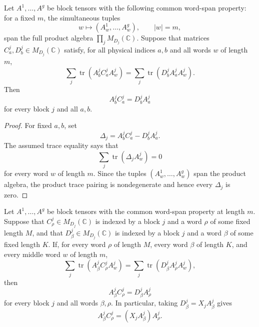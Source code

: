 \begin{lemma}
    \label{lem:blockwise_boundary_compatibility_from_traces}
    \leanok
    Let \(A^1,\ldots,A^g\) be block tensors with the following common
    word-span property: for a fixed \(m\), the simultaneous tuples
    \[
        w\longmapsto
        \left(A^1_w,\ldots,A^g_w\right),
        \qquad |w|=m,
    \]
    span the full product algebra
    \(\prod_j M_{D_j}(\mathbb C)\).
    Suppose that matrices \(C^j_a,D^j_b\in M_{D_j}(\mathbb C)\) satisfy,
    for all physical indices \(a,b\) and all words \(w\) of length \(m\),
    \[
        \sum_j \operatorname{tr}\!\left(A^j_b C^j_a A^j_w\right)
        =
        \sum_j \operatorname{tr}\!\left(D^j_b A^j_a A^j_w\right).
    \]
    Then
    \[
        A^j_bC^j_a=D^j_bA^j_a
    \]
    for every block \(j\) and all \(a,b\).
\end{lemma}

\begin{proof}
    \leanok
    For fixed \(a,b\), set
    \[
        \Delta_j=A^j_bC^j_a-D^j_bA^j_a .
    \]
    The assumed trace equality says that
    \[
        \sum_j \operatorname{tr}\!\left(\Delta_jA^j_w\right)=0
    \]
    for every word \(w\) of length \(m\).  Since the tuples
    \((A^1_w,\ldots,A^g_w)\) span the product algebra, the product trace
    pairing is nondegenerate and hence every \(\Delta_j\) is zero.
\end{proof}

\begin{lemma}
    \label{lem:blockwise_word_boundary_compatibility_from_traces}
    \leanok
    Let \(A^1,\ldots,A^g\) be block tensors with the common word-span property
    at length \(m\). Suppose that \(C^j_\rho \in M_{D_j}(\mathbb C)\) is
    indexed by a block \(j\) and a word \(\rho\) of some fixed length \(M\),
    and that \(D^j_\beta \in M_{D_j}(\mathbb C)\) is indexed by a block
    \(j\) and a word \(\beta\) of some fixed length \(K\). If, for every
    word \(\rho\) of length \(M\), every word \(\beta\) of length \(K\), and
    every middle word \(w\) of length \(m\),
    \[
        \sum_j\operatorname{tr}\!\left(A^j_\beta C^j_\rho A^j_w\right)
        =
        \sum_j\operatorname{tr}\!\left(D^j_\beta A^j_\rho A^j_w\right),
    \]
    then
    \[
        A^j_\beta C^j_\rho=D^j_\beta A^j_\rho
    \]
    for every block \(j\) and all words \(\beta,\rho\).  In particular, taking
    \(D^j_\beta=X_jA^j_\beta\) gives
    \[
        A^j_\beta C^j_\rho=(X_jA^j_\beta)A^j_\rho .
    \]
\end{lemma}

